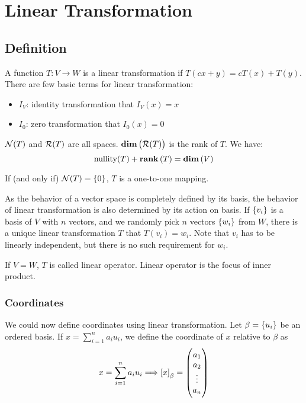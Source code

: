 
\section{Linear Transformation}

\subsection{Definition}
A function $T:V \rightarrow W$ is a linear transformation if $T(cx + y) = cT(x) + T(y)$. There are few basic terms for linear transformation:
\begin{itemize}
    \item $I_V$: identity transformation that $I_V (x) = x$
    \item $I_0$: zero transformation that $I_0 (x) = 0$
\end{itemize}

$\mathcal{N}(T)$ and $\mathcal{R}(T)$ are all spaces. $\displaystyle \mathbf{dim}\left( \mathcal{R}(T) \right)$ is the rank of $T$. We have:
\begin{equation}
    \text{nullity}(T) + \displaystyle \mathbf{rank}\left( T \right) = \displaystyle \mathbf{dim}\left( V \right)
\end{equation}

If (and only if) $\mathcal{N}(T) = \set{0}$, $T$ is a one-to-one mapping.

As the behavior of a vector space is completely defined by its basis, the behavior of linear transformation is also determined by its action on basis. If $\set{v_i}$ is a basis of $V$ with $n$ vectors, and we randomly pick $n$ vectors $\set{w_i}$ from $W$, there is a unique linear transformation $T$ that $T(v_i) = w_i$. Note that $v_i$ has to be linearly independent, but there is no such requirement for $w_i$.


If $V = W$, $T$ is called linear operator. Linear operator is the focus of inner product.

\subsubsection{Coordinates}
We could now define coordinates using linear transformation. Let $\beta = \set{u_i}$ be an ordered basis. If $x = \sum_{i=1}^n a_i u_i$, we define the coordinate of $x$ relative to $\beta$ as 
\begin{equation}
    x = \sum_{i=1}^n a_i u_i \Longrightarrow \coordinate{x}_\beta = \begin{pmatrix}
        a_1 \\
        a_2 \\
        \vdots \\
        a_n
    \end{pmatrix}
\end{equation}

